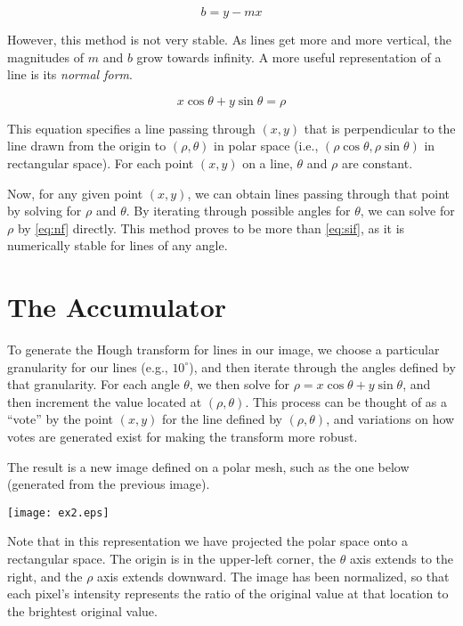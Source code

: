 \documentclass[12pt]{article}
\begin{document}
$$
b = y - mx
$$

However, this method is not very stable.  As lines get more and more vertical, the magnitudes of $m$ and $b$ grow towards infinity.  A more useful representation of a line is its \emph{normal form}.

\begin{equation}
x\cos\theta + y\sin\theta = \rho \label{eq:nf}
\end{equation}

This equation specifies a line passing through $(x, y)$ that is perpendicular to the line drawn from the origin to $(\rho, \theta)$ in polar space (i.e., $(\rho\cos\theta,\rho\sin\theta)$ in rectangular space).
For each point $(x, y)$ on a line, $\theta$ and $\rho$ are constant.

Now, for any given point $(x, y)$, we can obtain lines passing through that point by solving for $\rho$ and $\theta$.  By iterating through possible angles for $\theta$, we can solve for $\rho$ by \eqref{eq:nf} directly.  This method proves to be more  than \eqref{eq:sif}, as it is numerically stable for  lines of any angle.

\section*{The Accumulator}

To generate the Hough transform for  lines in our image, we choose a particular granularity for our lines (e.g., $10^\circ$), and then iterate through the angles defined by that granularity.  For each angle $\theta$, we then solve for $\rho = x\cos\theta + y\sin\theta$, and then increment the value located at $(\rho,\theta)$.  This process can be thought of as a ``vote'' by the point $(x,y)$ for the line defined by $(\rho,\theta)$, and variations on how votes are generated exist for making the transform more robust.

The result is a new image defined on a polar mesh, such as the one below (generated from the previous image).

\begin{center}
\texttt{[image: ex2.eps]}
\end{center}

Note that in this representation we have projected the polar space onto a rectangular space.  The origin is in the upper-left corner, the $\theta$ axis extends to the right, and the $\rho$ axis extends downward.  The image has been normalized, so that each pixel's intensity represents the ratio of the original value at that location to the brightest original value.
\end{document}
